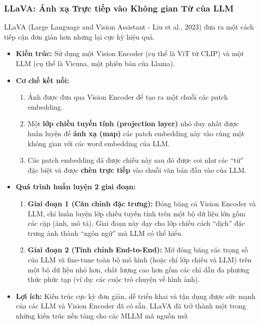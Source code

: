 \subsubsection{LLaVA: Ánh xạ Trực tiếp vào Không gian Từ của LLM}
LLaVA (Large Language and Vision Assistant - Liu et al., 2023) đưa ra một cách tiếp cận đơn giản hơn nhưng lại cực kỳ hiệu quả.
\begin{itemize}
    \item \textbf{Kiến trúc:} Sử dụng một Vision Encoder (cụ thể là ViT từ CLIP) và một LLM (cụ thể là Vicuna, một phiên bản của Llama).
    \item \textbf{Cơ chế kết nối:}
        \begin{enumerate}
            \item Ảnh được đưa qua Vision Encoder để tạo ra một chuỗi các patch embedding.
            \item Một \textbf{lớp chiếu tuyến tính (projection layer)} nhỏ duy nhất được huấn luyện để \textbf{ánh xạ (map)} các patch embedding này vào cùng một không gian với các word embedding của LLM.
            \item Các patch embedding đã được chiếu này sau đó được coi như các “từ” đặc biệt và được \textbf{chèn trực tiếp} vào chuỗi văn bản đầu vào của LLM.
        \end{enumerate}
    \item \textbf{Quá trình huấn luyện 2 giai đoạn:}
        \begin{enumerate}
            \item \textbf{Giai đoạn 1 (Căn chỉnh đặc trưng):} Đóng băng cả Vision Encoder và LLM, chỉ huấn luyện lớp chiếu tuyến tính trên một bộ dữ liệu lớn gồm các cặp (ảnh, mô tả). Giai đoạn này dạy cho lớp chiếu cách “dịch” đặc trưng ảnh thành “ngôn ngữ” mà LLM có thể hiểu.
            \item \textbf{Giai đoạn 2 (Tinh chỉnh End-to-End):} Mở đóng băng các trọng số của LLM và fine-tune toàn bộ mô hình (hoặc chỉ lớp chiếu và LLM) trên một bộ dữ liệu nhỏ hơn, chất lượng cao hơn gồm các chỉ dẫn đa phương thức phức tạp (ví dụ: các cuộc trò chuyện về hình ảnh).
        \end{enumerate}
    \item \textbf{Lợi ích:} Kiến trúc cực kỳ đơn giản, dễ triển khai và tận dụng được sức mạnh của các LLM và Vision Encoder đã có sẵn. LLaVA đã trở thành một trong những kiến trúc nền tảng cho các MLLM mã nguồn mở.
\end{itemize}

